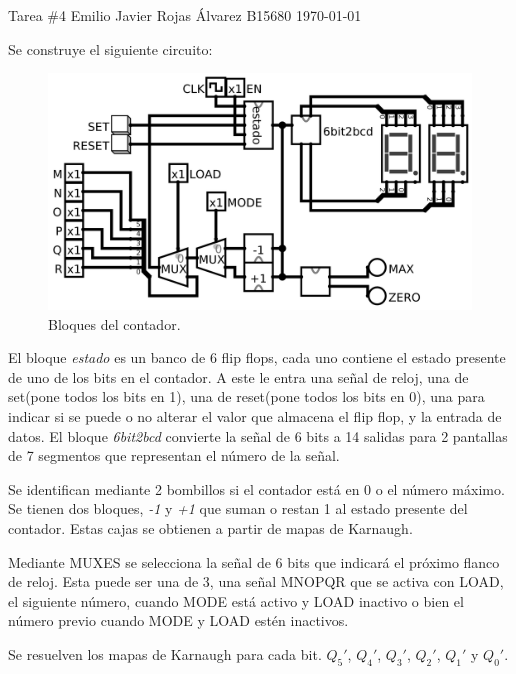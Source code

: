\documentclass{article}
\begin{document}

\portada
{Tarea \#4}
{Emilio Javier Rojas Álvarez}
{B15680}
{\today}


Se construye el siguiente circuito:
\begin{figure}[H]
  \includegraphics[width=\textwidth]{circuito/main.png}
  \caption{Bloques del contador.}
\end{figure}
El bloque \textit{estado} es un banco de 6 flip flops, cada uno contiene el
estado presente de uno de los bits en el contador. A este le entra una señal de
reloj, una de set(pone todos los bits en 1), una de reset(pone todos los bits en
0), una para indicar si se puede o no alterar el valor que almacena el flip
flop, y la entrada de datos. El bloque \textit{6bit2bcd} convierte la señal de 6
bits a 14 salidas para 2 pantallas de 7 segmentos que representan el número de
la señal.

Se identifican mediante 2 bombillos si el contador está en 0 o el número máximo.
Se tienen dos bloques, \textit{-1} y \textit{+1} que suman o restan 1 al estado
presente del contador. Estas cajas se obtienen a partir de mapas de Karnaugh.

Mediante MUXES se selecciona la señal de 6 bits que indicará el próximo flanco
de reloj. Esta puede ser una de 3, una señal MNOPQR que se activa con LOAD, el
siguiente número, cuando MODE está activo y LOAD inactivo o bien el número
previo cuando MODE y LOAD estén inactivos.




Se resuelven los mapas de Karnaugh para cada bit. $Q_5\prime$, $Q_4\prime$,
$Q_3\prime$, $Q_2\prime$, $Q_1\prime$ y $Q_0\prime$.






\end{document}
